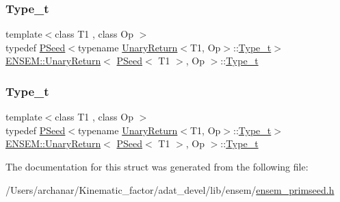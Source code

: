 \subsubsection{\texorpdfstring{Type\_t}{Type\_t}\hspace{0.1cm}{\footnotesize\ttfamily [1/2]}}
{\footnotesize\ttfamily template$<$class T1 , class Op $>$ \\
typedef \mbox{\hyperlink{classENSEM_1_1PSeed}{P\+Seed}}$<$typename \mbox{\hyperlink{structENSEM_1_1UnaryReturn}{Unary\+Return}}$<$T1, Op$>$\+::\mbox{\hyperlink{structENSEM_1_1UnaryReturn_3_01PSeed_3_01T1_01_4_00_01Op_01_4_a6145e0773bb5bec6d51ec81ef1837329}{Type\+\_\+t}}$>$ \mbox{\hyperlink{structENSEM_1_1UnaryReturn}{E\+N\+S\+E\+M\+::\+Unary\+Return}}$<$ \mbox{\hyperlink{classENSEM_1_1PSeed}{P\+Seed}}$<$ T1 $>$, Op $>$\+::\mbox{\hyperlink{structENSEM_1_1UnaryReturn_3_01PSeed_3_01T1_01_4_00_01Op_01_4_a6145e0773bb5bec6d51ec81ef1837329}{Type\+\_\+t}}}

\mbox{\label{structENSEM_1_1UnaryReturn_3_01PSeed_3_01T1_01_4_00_01Op_01_4_a6145e0773bb5bec6d51ec81ef1837329}} 
\subsubsection{\texorpdfstring{Type\_t}{Type\_t}\hspace{0.1cm}{\footnotesize\ttfamily [2/2]}}
{\footnotesize\ttfamily template$<$class T1 , class Op $>$ \\
typedef \mbox{\hyperlink{classENSEM_1_1PSeed}{P\+Seed}}$<$typename \mbox{\hyperlink{structENSEM_1_1UnaryReturn}{Unary\+Return}}$<$T1, Op$>$\+::\mbox{\hyperlink{structENSEM_1_1UnaryReturn_3_01PSeed_3_01T1_01_4_00_01Op_01_4_a6145e0773bb5bec6d51ec81ef1837329}{Type\+\_\+t}}$>$ \mbox{\hyperlink{structENSEM_1_1UnaryReturn}{E\+N\+S\+E\+M\+::\+Unary\+Return}}$<$ \mbox{\hyperlink{classENSEM_1_1PSeed}{P\+Seed}}$<$ T1 $>$, Op $>$\+::\mbox{\hyperlink{structENSEM_1_1UnaryReturn_3_01PSeed_3_01T1_01_4_00_01Op_01_4_a6145e0773bb5bec6d51ec81ef1837329}{Type\+\_\+t}}}



The documentation for this struct was generated from the following file\+:\begin{DoxyCompactItemize}
\item 
/\+Users/archanar/\+Kinematic\+\_\+factor/adat\+\_\+devel/lib/ensem/\mbox{\hyperlink{lib_2ensem_2ensem__primseed_8h}{ensem\+\_\+primseed.\+h}}\end{DoxyCompactItemize}
